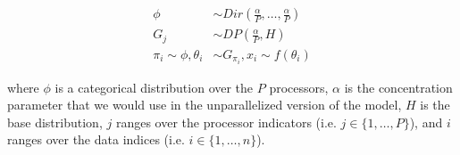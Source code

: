 \begin{align*}
  \phi &\sim Dir(\frac{\alpha}{P}, \ldots, \frac{\alpha}{P}) \\
  G_j &\sim DP(\frac{\alpha}{P}, H) \\
  \pi_i \sim \phi,
  \theta_i &\sim G_{\pi_i},
  x_i \sim f(\theta_i)
\end{align*}

where $\phi$ is a categorical distribution over the $P$ processors,
$\alpha$ is the concentration parameter that we would use in the
unparallelized version of the model, $H$ is the base distribution, $j$
ranges over the processor indicators (i.e. $j \in \{1, \ldots, P\}$),
and $i$ ranges over the data indices (i.e. $i \in \{1, \ldots, n\}$).
